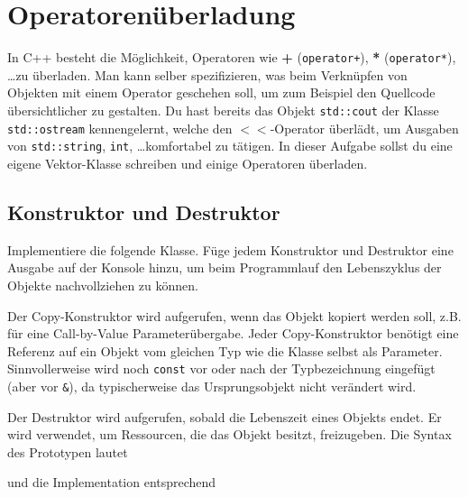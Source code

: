 \section{\ExercisePrefixBasics Operatorenüberladung}\label{sec:overloading}
\label{sec:overloading}
In C++ besteht die Möglichkeit, Operatoren wie \textbf{+} (\lstinline{operator+}), \textbf{*} (\lstinline{operator*}), \dots zu überladen.
Man kann selber spezifizieren, was beim Verknüpfen von Objekten mit einem Operator geschehen soll, um zum Beispiel den Quellcode übersichtlicher zu gestalten.
Du hast bereits das Objekt \lstinline{std::cout} der Klasse \lstinline{std::ostream} kennengelernt, welche den $<<$-Operator überlädt, um Ausgaben von \lstinline{std::string}, \lstinline{int}, \dots komfortabel zu tätigen.
In dieser Aufgabe sollst du eine eigene Vektor-Klasse schreiben und einige Operatoren überladen.


\subsection{Konstruktor und Destruktor}
Implementiere die folgende Klasse.
Füge jedem Konstruktor und Destruktor eine Ausgabe auf der Konsole hinzu, um beim Programmlauf den Lebenszyklus der Objekte nachvollziehen zu können.


Der Copy-Konstruktor wird aufgerufen, wenn das Objekt kopiert werden soll, z.B. für eine Call-by-Value Parameterübergabe.
Jeder Copy-Konstruktor benötigt eine Referenz auf ein Objekt vom gleichen Typ wie die Klasse selbst als Parameter. 
Sinnvollerweise wird noch \lstinline{const} vor oder nach der Typbezeichnung eingefügt (aber vor \lstinline{&}), da typischerweise das Ursprungsobjekt nicht verändert wird.

Der Destruktor wird aufgerufen, sobald die Lebenszeit eines Objekts endet. Er wird verwendet, um Ressourcen, die das Objekt besitzt, freizugeben.
Die Syntax des Prototypen lautet


und die Implementation entsprechend

